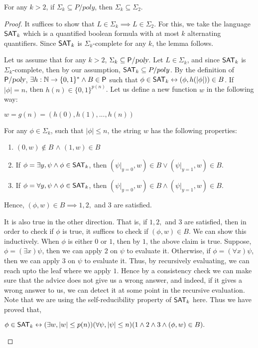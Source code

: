 \documentclass[11pt]{article}
\begin{document}
\begin{lemma}
 For any $k > 2$, if $\Sigma_{k} \subseteq P/poly$, then $\Sigma_{k} \subseteq \Sigma_{2}$.
\end{lemma}
\begin{proof}
It suffices to show that $L \in \Sigma_{k} \implies L \in \Sigma_{2}$. For this, we take the
language $\SAT_{k}$ which is a quantified boolean formula with at most $k$ alternating
quantifiers. Since $\SAT_{k}$ is $\Sigma_{k}$-complete for any $k$, the lemma follows.

Let us assume that for any $k > 2$, $\Sigma_{k} \subseteq \P/\poly$. Let $L \in \Sigma_{k}$, and
since $\SAT_{k}$ is $\Sigma_{k}$-complete, then by our assumption, $\SAT_{k} \subseteq P/poly$. By
the definition of $\P/\poly$, $\exists h : \mathbb{N} \rightarrow \{0, 1\}^* \wedge B \in \P$ such that
$\phi \in \SAT_{k} \leftrightarrow (\phi, h(|\phi|)) \in B$. If $|\phi| = n$, then $h(n) \in \{0,
1\}^{p(n)}$. Let us define a new function $w$ in the following way:

\begin{center}
\begin{math}
 w = g(n) = (h(0), h(1), ..., h(n))
\end{math}
\end{center}
For any $\phi \in \Sigma_{k}$, such that $|\phi|
\leq n$, the string $w$ has the following properties:
\begin{enumerate}
\item $(0, w) \notin B$ $\wedge$ $(1, w) \in B$
\item If $\phi = \exists y, \psi \wedge \phi \in \SAT_{k}$, then $(\psi |_{y = 0}, w) \in B \vee
(\psi |_{y = 1}, w) \in B$.
\item If $\phi = \forall y, \psi \wedge \phi \in \SAT_{k}$, then $(\psi |_{y = 0}, w) \in B \wedge
(\psi |_{y = 1}, w) \in B$.
\end{enumerate}
Hence, $(\phi, w) \in B \implies 1, 2,$ and $3$ are satisfied.

It is also true in the other direction. That is, if $1, 2, $ and $3 $ are satisfied, then in order to check if $\phi$ is true, it suffices to check if $(\phi, w) \in B$. We can show this inductively. When $\phi$ is either $0$ or $1$, then by $1$, the above claim is true. Suppose, $\phi = (\exists x) \psi$, then we can apply $2$ on $\psi$ to evaluate it.
Otherwise, if $\phi = (\forall x) \psi$, then we can apply $3$ on $\psi$ to evaluate it. Thus, by recursively evaluating, we can reach upto the leaf where we apply $1$. Hence by a consistency check we can make sure that the advice does not give us a wrong answer, and indeed, if it gives a wrong answer to us, we can detect it at some point in the recursive evaluation. Note that we are using the self-reducibility property of $\SAT_k$ here.
Thus we have proved that,
\begin{center}
 \begin{math}
  \phi \in \SAT_{k} \leftrightarrow (\exists w, |w| \leq p(n)) (\forall \psi, |\psi| \leq n) (1
\wedge 2 \wedge 3 \wedge (\phi, w) \in B).
 \end{math}
\end{center}
\end{proof}
\end{document}
